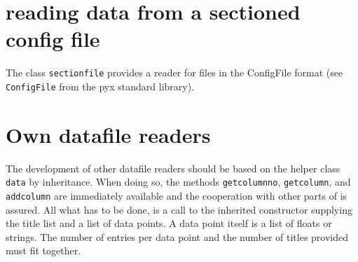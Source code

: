 \section{reading data from a sectioned config file}

The class \verb|sectionfile| provides a reader for files in the
ConfigFile format (see \verb|ConfigFile| from the pyx standard
library).

\section{Own datafile readers}

The development of other datafile readers should be based on the
helper class \verb|data| by inheritance. When doing so, the methods
\verb|getcolumnno|, \verb|getcolumn|, and \verb|addcolumn| are
immediately available and the cooperation with other parts of \PyX{}
is assured. All what has to be done, is a call to the inherited
constructor supplying the title list and a list of data points. A data
point itself is a list of floats or strings. The number of entries per
data point and the number of titles provided must fit together.
